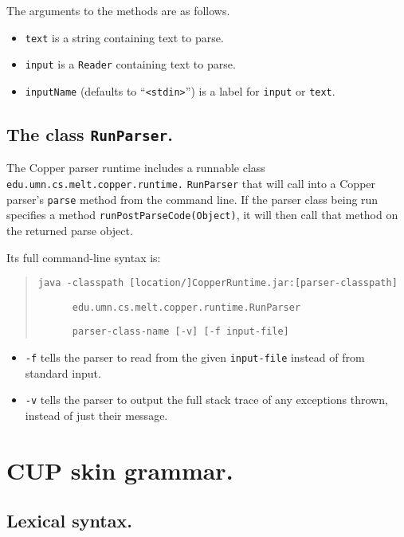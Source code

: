 \documentclass[12pt,english,twoside]{report}
\begin{document}
The arguments to the methods are as follows.

\begin{itemize}
\item \texttt{text} is a string containing text to parse.
\item \texttt{input} is a \texttt{Reader} containing text to parse.
\item \texttt{inputName} (defaults to {}``\texttt{<stdin>}'') is a label
for \texttt{input} or \texttt{text}.
\end{itemize}

\section{The class \texttt{RunParser}.}

The Copper parser runtime includes a runnable class
\texttt{edu.}\texttt{umn.}\texttt{cs.}\texttt{melt.}\texttt{copper.}\texttt{runtime.} \texttt{RunParser}
that will call into a Copper parser's \texttt{parse} method from the
command line. If the parser class being run specifies a method
\texttt{runPostParseCode(Object)}, it will then call that method on
the returned parse object.

Its full command-line syntax is:

\begin{quote}
\texttt{java -classpath [location/]CopperRuntime.jar:[parser-classpath]}

\texttt{~~~~~~edu.umn.cs.melt.copper.runtime.RunParser}

\texttt{~~~~~~parser-class-name [-v] [-f input-file]}
\end{quote}

\begin{itemize}
\item \texttt{-f} tells the parser to read from the given \texttt{input-file} instead of from standard input.
\item \texttt{-v} tells the parser to output the full stack trace of any exceptions thrown, instead of just their message.
\end{itemize}

\appendix

\chapter{\label{cha:CUP-skin-grammar.}CUP skin grammar.}


\section{Lexical syntax.}
\end{document}
